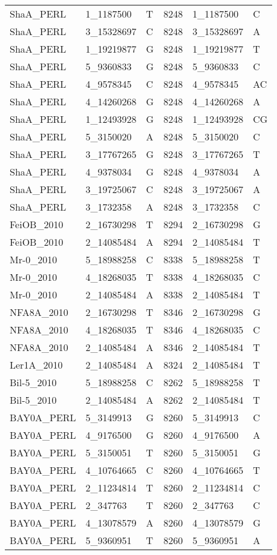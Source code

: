 \begin{center}
\begin{longtable}{|l|l|l|l|l|l|}
ShaA\_PERL&1\_1187500&T&8248&1\_1187500&C\\
ShaA\_PERL&3\_15328697&C&8248&3\_15328697&A\\
ShaA\_PERL&1\_19219877&G&8248&1\_19219877&T\\
ShaA\_PERL&5\_9360833&G&8248&5\_9360833&C\\
ShaA\_PERL&4\_9578345&C&8248&4\_9578345&AC\\
ShaA\_PERL&4\_14260268&G&8248&4\_14260268&A\\
ShaA\_PERL&1\_12493928&G&8248&1\_12493928&CG\\
ShaA\_PERL&5\_3150020&A&8248&5\_3150020&C\\
ShaA\_PERL&3\_17767265&G&8248&3\_17767265&T\\
ShaA\_PERL&4\_9378034&G&8248&4\_9378034&A\\
ShaA\_PERL&3\_19725067&C&8248&3\_19725067&A\\
ShaA\_PERL&3\_1732358&A&8248&3\_1732358&C\\
FeiOB\_2010&2\_16730298&T&8294&2\_16730298&G\\
FeiOB\_2010&2\_14085484&A&8294&2\_14085484&T\\
Mr-0\_2010&5\_18988258&C&8338&5\_18988258&T\\
Mr-0\_2010&4\_18268035&T&8338&4\_18268035&C\\
Mr-0\_2010&2\_14085484&A&8338&2\_14085484&T\\
NFA8A\_2010&2\_16730298&T&8346&2\_16730298&G\\
NFA8A\_2010&4\_18268035&T&8346&4\_18268035&C\\
NFA8A\_2010&2\_14085484&A&8346&2\_14085484&T\\
Ler1A\_2010&2\_14085484&A&8324&2\_14085484&T\\
Bil-5\_2010&5\_18988258&C&8262&5\_18988258&T\\
Bil-5\_2010&2\_14085484&A&8262&2\_14085484&T\\
BAY0A\_PERL&5\_3149913&G&8260&5\_3149913&C\\
BAY0A\_PERL&4\_9176500&G&8260&4\_9176500&A\\
BAY0A\_PERL&5\_3150051&T&8260&5\_3150051&G\\
BAY0A\_PERL&4\_10764665&C&8260&4\_10764665&T\\
BAY0A\_PERL&2\_11234814&T&8260&2\_11234814&C\\
BAY0A\_PERL&2\_347763&T&8260&2\_347763&C\\
BAY0A\_PERL&4\_13078579&A&8260&4\_13078579&G\\
BAY0A\_PERL&5\_9360951&T&8260&5\_9360951&A\\

\end{longtable}
\end{center}

